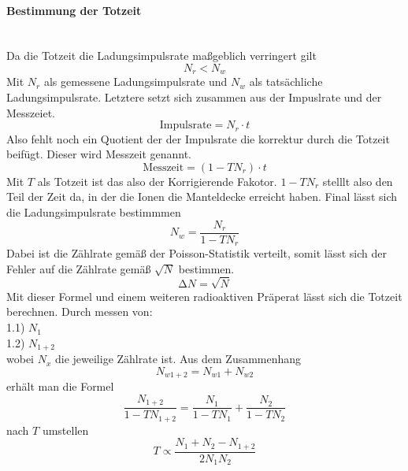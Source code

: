 \paragraph{Bestimmung der Totzeit} 
\label{para:Totzeit}
\mbox{} \\
Da die Totzeit die Ladungsimpulsrate maßgeblich verringert gilt
\begin{equation*}
\label{ref:totzeitverhaeltnis}
N_r < N_w
\end{equation*}
Mit $N_r$ als gemessene Ladungsimpulsrate und $N_w$ als tatsächliche Ladungsimpulsrate. 
Letztere setzt sich zusammen aus der Impuslrate und der Messzeiet.
\begin{equation*}
\text{Impulsrate} = N_r \cdot t
\end{equation*} 
Also fehlt noch ein Quotient der der Impulsrate die korrektur durch die Totzeit beifügt. Dieser wird Messzeit genannt.
\begin{equation*}
\text{Messzeit} = (1-TN_r) \cdot t
\end{equation*}
Mit $T$ als Totzeit ist das also der Korrigierende Fakotor. $1-TN_r$ stelllt also den Teil der Zeit da, in der die Ionen die Manteldecke erreicht haben.
Final lässt sich die Ladungsimpulsrate bestimmmen 
\begin{equation}
\label{ref:Ladungsimpulsrate}
N_w = \frac{N_r}{1-TN_r}
\end{equation}
Dabei ist die Zählrate gemäß der Poisson-Statistik verteilt, somit lässt sich der Fehler auf die Zählrate gemäß $\sqrt{N}$
bestimmen.
\begin{equation}
\label{eqn:fehlerzählrate} %
\increment N = \sqrt{N}
\end{equation}
Mit dieser Formel und einem weiteren radioaktiven Präperat  lässt sich die Totzeit berechnen. 
Durch messen von:\\
1.1)  $N_1$  \\
1.2) $N_{1+2}$\\
wobei $N_x$ die jeweilige Zählrate ist.
Aus dem Zusammenhang 
\begin{equation*}
N_{w1+2} = N_{w1} + N_{w2}
\end{equation*}
erhält man die Formel
\begin{equation*}
\frac{N_{1+2}}{1-TN_{1+2}}=\frac{N_1}{1-TN_1} + \frac{N_2}{1-TN_2}
\end{equation*}
nach $T$ umstellen
\begin{equation}
\label{eqn:totzeit}
T \propto \frac{N_1+N_2-N_{1+2}}{2N_1N_2}
\end{equation}


